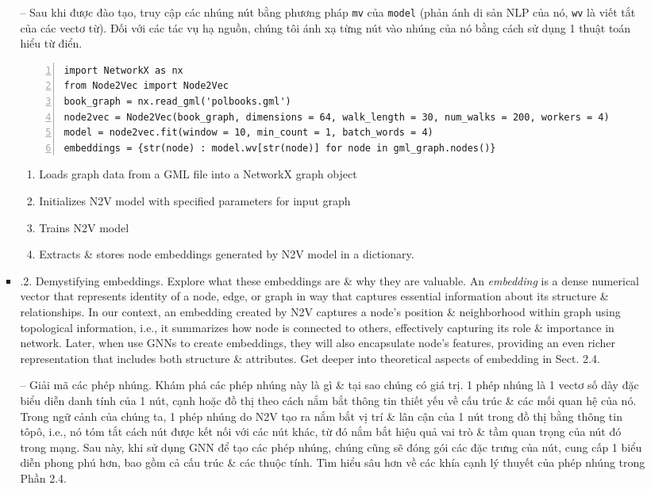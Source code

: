 \documentclass{article}
\begin{document}
\begin{itemize}
\begin{itemize}
\begin{itemize}
           -- Sau khi được đào tạo, truy cập các nhúng nút bằng phương pháp {\tt mv} của {\tt model} (phản ánh di sản NLP của nó, {\tt wv} là viết tắt của các vectơ từ). Đối với các tác vụ hạ nguồn, chúng tôi ánh xạ từng nút vào nhúng của nó bằng cách sử dụng 1 thuật toán hiểu từ điển.
           \begin{Verbatim}[numbers=left,xleftmargin=5mm]
import NetworkX as nx
from Node2Vec import Node2Vec
book_graph = nx.read_gml('polbooks.gml')
node2vec = Node2Vec(book_graph, dimensions = 64, walk_length = 30, num_walks = 200, workers = 4)
model = node2vec.fit(window = 10, min_count = 1, batch_words = 4)
embeddings = {str(node) : model.wv[str(node)] for node in gml_graph.nodes()}
           \end{Verbatim}
           \begin{enumerate}
               \item Loads graph data from a GML file into a NetworkX graph object
               \item Initializes N2V model with specified parameters for input graph
               \item Trains N2V model
               \item Extracts \& stores node embeddings generated by N2V model in a dictionary.
           \end{enumerate}
           \item {.2. Demystifying embeddings.} Explore what these embeddings are \& why they are valuable. An {\it embedding} is a dense numerical vector that represents identity of a node, edge, or graph in way that captures essential information about its structure \& relationships. In our context, an embedding created by N2V captures a node's position \& neighborhood within graph using topological information, i.e., it summarizes how node is connected to others, effectively capturing its role \& importance in network. Later, when use GNNs to create embeddings, they will also encapsulate node's features, providing an even richer representation that includes both structure \& attributes. Get deeper into theoretical aspects of embedding in Sect. 2.4.

           -- {\sf Giải mã các phép nhúng.} Khám phá các phép nhúng này là gì \& tại sao chúng có giá trị. 1 phép nhúng {\it} là 1 vectơ số dày đặc biểu diễn danh tính của 1 nút, cạnh hoặc đồ thị theo cách nắm bắt thông tin thiết yếu về cấu trúc \& các mối quan hệ của nó. Trong ngữ cảnh của chúng ta, 1 phép nhúng do N2V tạo ra nắm bắt vị trí \& lân cận của 1 nút trong đồ thị bằng thông tin tôpô, i.e., nó tóm tắt cách nút được kết nối với các nút khác, từ đó nắm bắt hiệu quả vai trò \& tầm quan trọng của nút đó trong mạng. Sau này, khi sử dụng GNN để tạo các phép nhúng, chúng cũng sẽ đóng gói các đặc trưng của nút, cung cấp 1 biểu diễn phong phú hơn, bao gồm cả cấu trúc \& các thuộc tính. Tìm hiểu sâu hơn về các khía cạnh lý thuyết của phép nhúng trong Phần 2.4.


\end{itemize}
\end{itemize}
\end{itemize}
\end{document}
